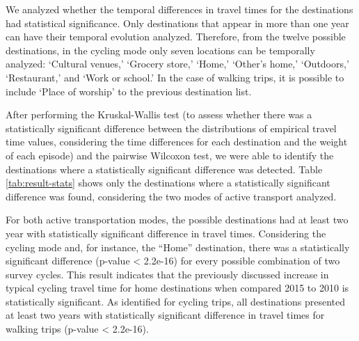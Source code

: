 \documentclass[preprint, 3p,
authoryear]{elsarticle} %
\begin{document}
We analyzed whether the temporal differences in travel times for the
destinations had statistical significance. Only destinations that appear
in more than one year can have their temporal evolution analyzed.
Therefore, from the twelve possible destinations, in the cycling mode
only seven locations can be temporally analyzed: `Cultural venues,'
`Grocery store,' `Home,' `Other's home,' `Outdoors,' `Restaurant,' and
`Work or school.' In the case of walking trips, it is possible to
include `Place of worship' to the previous destination list.

After performing the Kruskal-Wallis test (to assess whether there was a
statistically significant difference between the distributions of
empirical travel time values, considering the time differences for each
destination and the weight of each episode) and the pairwise Wilcoxon
test, we were able to identify the destinations where a statistically
significant difference was detected. Table \ref{tab:result-stats} shows
only the destinations where a statistically significant difference was
found, considering the two modes of active transport analyzed.

For both active transportation modes, the possible destinations had at
least two year with statistically significant difference in travel
times. Considering the cycling mode and, for instance, the ``Home''
destination, there was a statistically significant difference (p-value
\textless{} 2.2e-16) for every possible combination of two survey
cycles. This result indicates that the previously discussed increase in
typical cycling travel time for home destinations when compared 2015 to
2010 is statistically significant. As identified for cycling trips, all
destinations presented at least two years with statistically significant
difference in travel times for walking trips (p-value \textless{}
2.2e-16).
\end{document}

